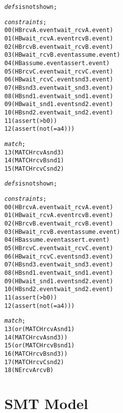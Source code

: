 \newsavebox{\boxSMTb}
\begin{lrbox}{\boxSMTb}
\begin{minipage}[c]{0.4\linewidth}
\begin{alltt}
\textit{defs} is not shown;

\textit{constraints};
00 (HB rcvA.event wait_rcvA.event)
01 (HB wait_rcvA.event rcvB.event)
02 (HB rcvB.event wait_rcvB.event)
03 (HB wait_rcvB.event assume.event)
04 (HB assume.event assert.event)
05 (HB rcvC.event wait_rcvC.event)
06 (HB wait_rcvC.event snd3.event)
07 (HB snd3.event wait_snd3.event)
08 (HB snd1.event wait_snd1.event)
09 (HB wait_snd1.event snd2.event)
10 (HB snd2.event wait_snd2.event)
11 (assert (> b 0))
12 (assert (not (= a 4)))

\textit{match};
13 (MATCH rcvA snd3)
14 (MATCH rcvB snd1)
15 (MATCH rcvC snd2)

\end{alltt}
\end{minipage}
\end{lrbox}

\newsavebox{\boxSMTc}
\begin{lrbox}{\boxSMTc}
\begin{minipage}[c]{0.4\linewidth}
\begin{alltt}
\textit{defs} is not shown;

\textit{constraints};
00 (HB rcvA.event wait_rcvA.event)
01 (HB wait_rcvA.event rcvB.event)
02 (HB rcvB.event wait_rcvB.event)
03 (HB wait_rcvB.event assume.event)
04 (HB assume.event assert.event)
05 (HB rcvC.event wait_rcvC.event)
06 (HB wait_rcvC.event snd3.event)
07 (HB snd3.event wait_snd3.event)
08 (HB snd1.event wait_snd1.event)
09 (HB wait_snd1.event snd2.event)
10 (HB snd2.event wait_snd2.event)
11 (assert (> b 0))
12 (assert (not (= a 4)))

\textit{match};
13 (or (MATCH rcvA snd1)
14     (MATCH rcvA snd3))
15 (or (MATCH rcvB snd1)
16     (MATCH rcvB snd3))
17 (MATCH rcvC snd2)
18 (NE rcvA rcvB)

\end{alltt}
\end{minipage}
\end{lrbox}




\section{SMT Model}\label{sec:smt}


